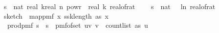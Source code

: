 \begin{isabellebody}
\ \ \ {\isachardoublequoteopen}s\ {\isasymequiv}\ nat\ {\isasymlceil}{}{\isacharasterisk}{\kern0pt}real\ k{\isacharasterisk}{\kern0pt}{\isacharparenleft}{\kern0pt}real\ n{\isacharparenright}{\kern0pt}\ powr\ {\isacharparenleft}{\kern0pt}{}{\isacharminus}{\kern0pt}{}{\isacharslash}{\kern0pt}\ real\ k{\isacharparenright}{\kern0pt}{\isacharslash}{\kern0pt}\ {\isacharparenleft}{\kern0pt}real{\isacharunderscore}{\kern0pt}of{\isacharunderscore}{\kern0pt}rat\ {\isasymdelta}{\isacharparenright}{\kern0pt}\isanewline
\ \ \ {\isachardoublequoteopen}s\ {\isasymequiv}\ nat\ {\isasymlceil}{\isacharminus}{\kern0pt}{\isacharparenleft}{\kern0pt}{}{}\ {\isacharasterisk}{\kern0pt}\ ln\ {\isacharparenleft}{\kern0pt}real{\isacharunderscore}{\kern0pt}of{\isacharunderscore}{\kern0pt}rat\ {\isasymepsilon}{\isacharparenright}{\kern0pt}{\isacharparenright}{\kern0pt}{\isasymrceil}{\isachardoublequoteclose}\isanewline
\ \ \ {\isachardoublequoteopen}sketch\ {\isacharequal}{\kern0pt}\ map{\isacharunderscore}{\kern0pt}pmf\ {\isacharparenleft}{\kern0pt}{\isasymlambda}x{\isachardot}{\kern0pt}\ {\isacharparenleft}{\kern0pt}ssk{\isacharcomma}{\kern0pt}length\ as{\isacharcomma}{\kern0pt}\ x{\isacharparenright}{\kern0pt}{\isacharparenright}{\kern0pt}\ \isanewline
\ \ \ \ {\isacharparenleft}{\kern0pt}prod{\isacharunderscore}{\kern0pt}pmf\ {\isacharparenleft}{\kern0pt}{\isacharbraceleft}{\kern0pt}{}{\isachardot}{\kern0pt}{\isachardot}{\kern0pt}{\isacharless}{\kern0pt}s\ {\isasymtimes}\ {\isacharbraceleft}{\kern0pt}{}{\isachardot}{\kern0pt}{\isachardot}{\kern0pt}{\isacharless}{\kern0pt}s\ {\isacharparenleft}{\kern0pt}{\isasymlambda}{\isacharunderscore}{\kern0pt}{\isachardot}{\kern0pt}\ pmf{\isacharunderscore}{\kern0pt}of{\isacharunderscore}{\kern0pt}set\ {\isacharbraceleft}{\kern0pt}{\isacharparenleft}{\kern0pt}u{\isacharcomma}{\kern0pt}v{\isacharparenright}{\kern0pt}{\isachardot}{\kern0pt}\ v\ {\isacharless}{\kern0pt}\ count{\isacharunderscore}{\kern0pt}list\ as\ u{\isacharbraceright}{\kern0pt}{\isacharparenright}{\kern0pt}{\isacharparenright}{\kern0pt}{\isachardoublequoteclose}\ \isanewline
%
\isadelimproof

\end{isabellebody}
